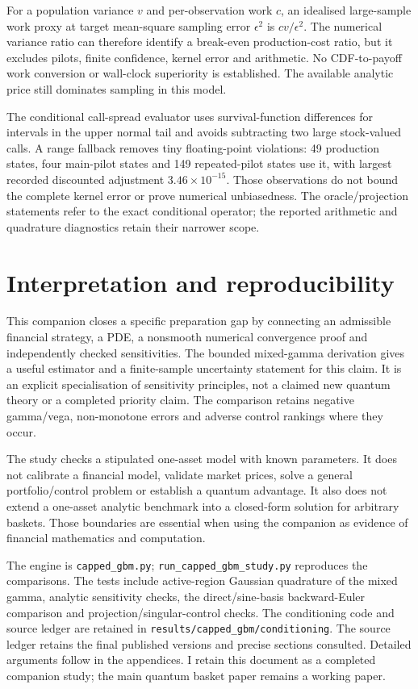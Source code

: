 \documentclass[11pt]{article}
\begin{document}
For a population variance $v$ and per-observation work $c$, an idealised
large-sample work proxy at target mean-square sampling error $\epsilon^2$
is $cv/\epsilon^2$. The numerical variance ratio can therefore identify a
break-even production-cost ratio, but it excludes pilots, finite confidence,
kernel error and arithmetic. No CDF-to-payoff work conversion or wall-clock
superiority is established. The available analytic price still dominates
sampling in this model.

The conditional call-spread evaluator uses survival-function differences
for intervals in the upper normal tail and avoids subtracting two large
stock-valued calls. A range fallback removes tiny floating-point violations:
49 production states, four main-pilot states and 149 repeated-pilot states
use it, with largest recorded discounted adjustment
$3.46\times10^{-15}$. Those observations do not bound the complete kernel
error or prove numerical unbiasedness. The oracle/projection statements
refer to the exact conditional operator; the reported arithmetic and
quadrature diagnostics retain their narrower scope.

\section{Interpretation and reproducibility}

This companion closes a specific preparation gap by connecting an
admissible financial strategy, a PDE, a nonsmooth numerical convergence
proof and independently checked sensitivities. The bounded mixed-gamma
derivation gives a useful estimator and a finite-sample uncertainty
statement for this claim. It is an explicit specialisation of sensitivity
principles, not a claimed new quantum theory or a completed priority claim.
The comparison retains negative gamma/vega, non-monotone errors and
adverse control rankings where they occur.

The study checks a stipulated one-asset model with known parameters. It
does not calibrate a financial model, validate market prices, solve a
general portfolio/control problem or establish a quantum advantage.
It also does not extend a one-asset analytic benchmark into a closed-form
solution for arbitrary baskets. Those boundaries are essential when
using the companion as evidence of financial mathematics and computation.

The engine is \texttt{capped\_gbm.py};
\texttt{run\_capped\_gbm\_study.py} reproduces the comparisons.
The tests include active-region Gaussian quadrature of the mixed gamma,
analytic sensitivity checks, the direct/sine-basis backward-Euler comparison
and projection/singular-control checks. The conditioning code and source
ledger are retained in \texttt{results/capped\_gbm/conditioning}. The source ledger retains the final published
versions and precise sections consulted. Detailed arguments follow in
the appendices. I retain this document as a completed companion study;
the main quantum basket paper remains a working paper.
\end{document}
